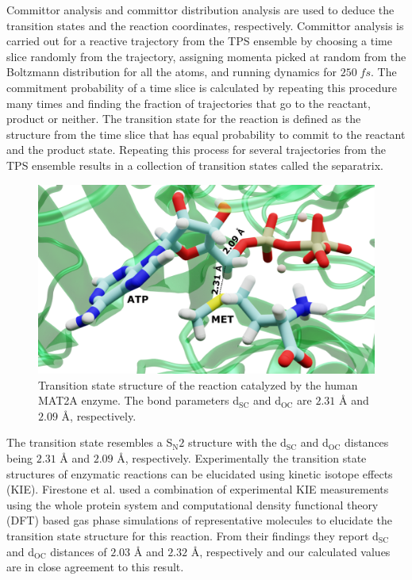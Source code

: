 \documentclass[journal=jpcbfk,manuscript=article,layout=traditional]{achemso}
\begin{document}
Committor analysis and committor distribution analysis are used to deduce 
the transition states and the reaction coordinates, respectively. 
Committor analysis is carried out for a reactive trajectory 
from the TPS ensemble by choosing a time slice randomly from the trajectory, assigning
momenta picked at random from the Boltzmann distribution for all the atoms, and running 
dynamics for $250\;fs$. The commitment probability of a time slice is calculated by 
repeating this procedure many times and finding the fraction of trajectories that go 
to the reactant, product or neither. The transition state for the reaction is defined as 
the structure from the time slice that has equal probability to commit to the reactant 
and the product state. Repeating this process for several trajectories from the TPS
ensemble results in a collection of transition states called the separatrix.
\begin{figure}[ht!]
\includegraphics[scale=0.12]{figures/mat2a-trans-labelled.png}
\caption{Transition state structure of the reaction catalyzed by the human MAT2A enzyme.
The bond parameters d$_{\text{SC}}$ and d$_{\text{OC}}$ are $2.31$ {\AA} and $2.09$ {\AA}, 
respectively.}
\label{fig:mat2a-trans-struct}
\end{figure}
The transition state resembles a S$_{\text{N}}2$ structure with the 
d$_{\text{SC}}$ and d$_{\text{OC}}$ distances being $2.31$ {\AA} and $2.09$ {\AA}, respectively.
Experimentally the transition state structures of enzymatic reactions
can be elucidated using kinetic isotope effects (KIE). \cite{Schramm99MetEnzym308p301}
Firestone et al. \cite{Firestone17JAmChemSoc139p13754} used a combination of experimental 
KIE measurements using the whole protein system and computational density functional 
theory (DFT) based gas phase simulations of representative molecules to elucidate the 
transition state structure for this reaction. From their findings they report 
d$_{\text{SC}}$ and d$_{\text{OC}}$ distances of $2.03$ {\AA} and $2.32$ {\AA}, 
respectively and our calculated values are in close agreement to this result. 
\end{document}
